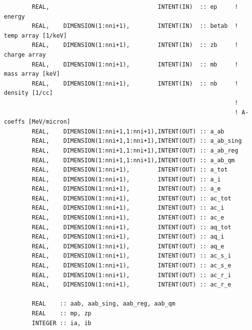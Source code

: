 \documentclass[preprint,12pt,eqsecnum,nofootinbib,amsmath,amssymb]{revtex4}
\begin{document}
{\begin{verbatim}
        REAL,                               INTENT(IN)  :: ep     !  energy
        REAL,    DIMENSION(1:nni+1),        INTENT(IN)  :: betab  !  temp array [1/keV]
        REAL,    DIMENSION(1:nni+1),        INTENT(IN)  :: zb     !  charge array
        REAL,    DIMENSION(1:nni+1),        INTENT(IN)  :: mb     !  mass array [keV]
        REAL,    DIMENSION(1:nni+1),        INTENT(IN)  :: nb     !  density [1/cc]
                                                                  !
                                                                  ! A-coeffs [MeV/micron]
        REAL,    DIMENSION(1:nni+1,1:nni+1),INTENT(OUT) :: a_ab
        REAL,    DIMENSION(1:nni+1,1:nni+1),INTENT(OUT) :: a_ab_sing
        REAL,    DIMENSION(1:nni+1,1:nni+1),INTENT(OUT) :: a_ab_reg
        REAL,    DIMENSION(1:nni+1,1:nni+1),INTENT(OUT) :: a_ab_qm
        REAL,    DIMENSION(1:nni+1),        INTENT(OUT) :: a_tot
        REAL,    DIMENSION(1:nni+1),        INTENT(OUT) :: a_i
        REAL,    DIMENSION(1:nni+1),        INTENT(OUT) :: a_e
        REAL,    DIMENSION(1:nni+1),        INTENT(OUT) :: ac_tot
        REAL,    DIMENSION(1:nni+1),        INTENT(OUT) :: ac_i
        REAL,    DIMENSION(1:nni+1),        INTENT(OUT) :: ac_e
        REAL,    DIMENSION(1:nni+1),        INTENT(OUT) :: aq_tot
        REAL,    DIMENSION(1:nni+1),        INTENT(OUT) :: aq_i
        REAL,    DIMENSION(1:nni+1),        INTENT(OUT) :: aq_e
        REAL,    DIMENSION(1:nni+1),        INTENT(OUT) :: ac_s_i
        REAL,    DIMENSION(1:nni+1),        INTENT(OUT) :: ac_s_e
        REAL,    DIMENSION(1:nni+1),        INTENT(OUT) :: ac_r_i
        REAL,    DIMENSION(1:nni+1),        INTENT(OUT) :: ac_r_e

        REAL    :: aab, aab_sing, aab_reg, aab_qm
        REAL    :: mp, zp
        INTEGER :: ia, ib


\end{verbatim}}
\end{document}
